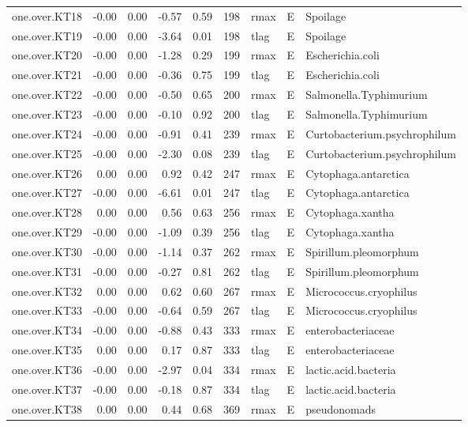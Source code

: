 \begin{table}[ht]
\begin{tabular}{rrrrrrlll}
  one.over.KT18 & -0.00 & 0.00 & -0.57 & 0.59 & 198 & rmax & E & Spoilage \\ 
  one.over.KT19 & -0.00 & 0.00 & -3.64 & 0.01 & 198 & tlag & E & Spoilage \\ 
  one.over.KT20 & -0.00 & 0.00 & -1.28 & 0.29 & 199 & rmax & E & Escherichia.coli \\ 
  one.over.KT21 & -0.00 & 0.00 & -0.36 & 0.75 & 199 & tlag & E & Escherichia.coli \\ 
  one.over.KT22 & -0.00 & 0.00 & -0.50 & 0.65 & 200 & rmax & E & Salmonella.Typhimurium \\ 
  one.over.KT23 & -0.00 & 0.00 & -0.10 & 0.92 & 200 & tlag & E & Salmonella.Typhimurium \\ 
  one.over.KT24 & -0.00 & 0.00 & -0.91 & 0.41 & 239 & rmax & E & Curtobacterium.psychrophilum \\ 
  one.over.KT25 & -0.00 & 0.00 & -2.30 & 0.08 & 239 & tlag & E & Curtobacterium.psychrophilum \\ 
  one.over.KT26 & 0.00 & 0.00 & 0.92 & 0.42 & 247 & rmax & E & Cytophaga.antarctica \\ 
  one.over.KT27 & -0.00 & 0.00 & -6.61 & 0.01 & 247 & tlag & E & Cytophaga.antarctica \\ 
  one.over.KT28 & 0.00 & 0.00 & 0.56 & 0.63 & 256 & rmax & E & Cytophaga.xantha \\ 
  one.over.KT29 & -0.00 & 0.00 & -1.09 & 0.39 & 256 & tlag & E & Cytophaga.xantha \\ 
  one.over.KT30 & -0.00 & 0.00 & -1.14 & 0.37 & 262 & rmax & E & Spirillum.pleomorphum \\ 
  one.over.KT31 & -0.00 & 0.00 & -0.27 & 0.81 & 262 & tlag & E & Spirillum.pleomorphum \\ 
  one.over.KT32 & 0.00 & 0.00 & 0.62 & 0.60 & 267 & rmax & E & Micrococcus.cryophilus \\ 
  one.over.KT33 & -0.00 & 0.00 & -0.64 & 0.59 & 267 & tlag & E & Micrococcus.cryophilus \\ 
  one.over.KT34 & -0.00 & 0.00 & -0.88 & 0.43 & 333 & rmax & E & enterobacteriaceae \\ 
  one.over.KT35 & 0.00 & 0.00 & 0.17 & 0.87 & 333 & tlag & E & enterobacteriaceae \\ 
  one.over.KT36 & -0.00 & 0.00 & -2.97 & 0.04 & 334 & rmax & E & lactic.acid.bacteria \\ 
  one.over.KT37 & -0.00 & 0.00 & -0.18 & 0.87 & 334 & tlag & E & lactic.acid.bacteria \\ 
  one.over.KT38 & 0.00 & 0.00 & 0.44 & 0.68 & 369 & rmax & E & pseudonomads \\ 

\end{tabular}
\end{table}
